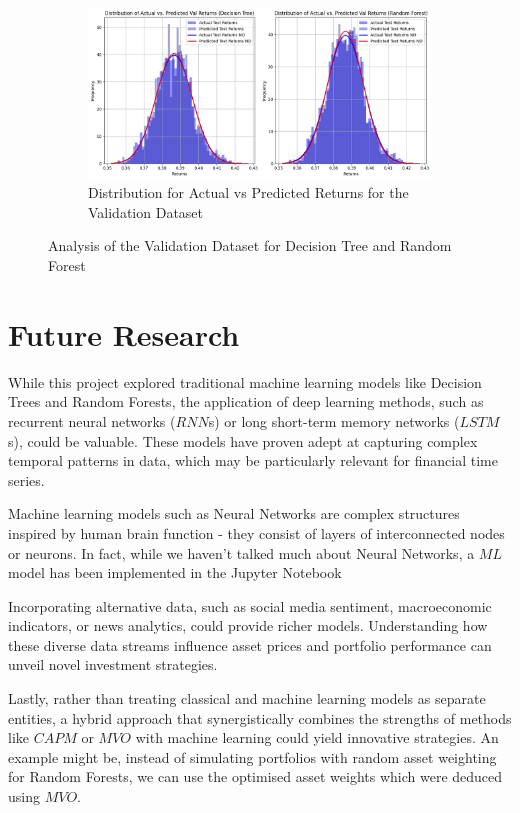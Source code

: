 \documentclass[a4paper,12pt,titlepage]{article}
\numberwithin{equation}{section}
\begin{document}
\begin{figure}[!htbp]
	\vspace{0.2cm} 
	
	\begin{subfigure}[!b]{0.8\linewidth}
		\includegraphics[width=\linewidth,keepaspectratio]{Plots/ValidationDistribution.png}
		\caption{Distribution for Actual vs Predicted Returns for the Validation Dataset}
		\label{fig:figure11}
	\end{subfigure}
	
	\caption{Analysis of the Validation Dataset for Decision Tree and Random Forest}
	\label{fig:combinedfigure2}

\end{figure}

\section{Future Research}

While this project explored traditional machine learning models like Decision Trees and Random Forests, the application 
of deep learning methods, such as recurrent neural networks ($RNN$s) or long short-term memory networks ($LSTM$s), could be 
valuable. These models have proven adept at capturing complex temporal patterns in data, which may be particularly relevant 
for financial time series. \newline \par \noindent Machine learning models such as Neural 
Networks are complex structures inspired by human brain function - they consist of layers of interconnected nodes 
or neurons. In fact, while we haven't talked much about Neural Networks, a $ML$ model has been implemented in the 
Jupyter Notebook \newline \par \noindent Incorporating alternative data, such as social media sentiment, macroeconomic indicators, 
or news analytics, could provide richer models. Understanding how these diverse data streams influence asset prices 
and portfolio performance can unveil novel investment strategies. \newline \par \noindent Lastly, rather than treating classical and machine 
learning models as separate entities, a hybrid approach that synergistically combines the strengths of methods like $CAPM$ 
or $MVO$ with machine learning could yield innovative strategies. An example might be, instead of simulating portfolios
with random asset weighting for Random Forests, we can use the optimised asset weights which were deduced using $MVO$.
\end{document}

